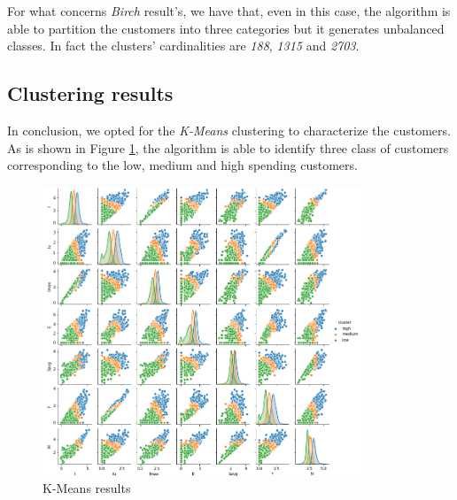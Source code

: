 For what concerns \emph{Birch} result's, we have that, even in this case, the algorithm is able to partition the customers into three categories but it generates unbalanced classes. In fact the clusters' cardinalities are \emph{188}, \emph{1315} and \emph{2703}.

\newpage

\subsection{Clustering results}

In conclusion, we opted for the \emph{K-Means} clustering to characterize the customers. As is shown in Figure \ref{fig:pairplot}, the algorithm is able to identify three class of customers corresponding to the low, medium and high spending customers.

\begin{figure}[h!]
	\captionsetup{justification=centering}
	\centering
	\includegraphics[width=0.85\textwidth]{img/clustering/pair_plot_clust.png}
	\centering
	\caption{K-Means results}
	\label{fig:pairplot}
\end{figure}





